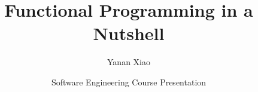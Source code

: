 \documentclass[12pt,hyperref=true,mathserif]{beamer}
\begin{document}
\title{Functional Programming in a Nutshell}
\author{Yanan Xiao}
\date[CIS502 Presentation]{Software Engineering Course Presentation}

\begin{frame}
\titlepage
\end{frame}
\end{document}
